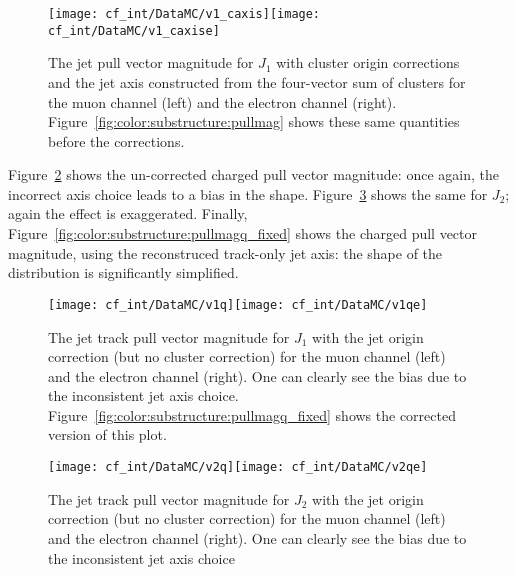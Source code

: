 \begin{figure}[h!]
\begin{center}
\texttt{[image: cf\_int/DataMC/v1\_caxis]}\texttt{[image: cf\_int/DataMC/v1\_caxise]}
 \caption{The jet pull vector magnitude for $J_1$ with cluster origin corrections and the jet axis constructed from the four-vector sum of clusters for the muon channel (left) and the electron channel (right). Figure~\ref{fig:color:substructure:pullmag} shows these same quantities before the corrections.}
 \label{fig:color:substructure:pullmag_fixed}
  \end{center}
\end{figure}


Figure~\ref{fig:color:substructure:pullmagq} shows the un-corrected charged pull vector magnitude: once again, the incorrect axis choice leads to a bias in the shape. Figure~\ref{fig:color:substructure:pullmagq_2} shows the same for $J_2$; again the effect is exaggerated. Finally, Figure~\ref{fig:color:substructure:pullmagq_fixed} shows the charged pull vector magnitude, using the reconstruced track-only jet axis: the shape of the distribution is significantly simplified.

\begin{figure}[h!]
\begin{center}
\texttt{[image: cf\_int/DataMC/v1q]}\texttt{[image: cf\_int/DataMC/v1qe]}
 \caption{The jet track pull vector magnitude for $J_1$ with the jet origin correction (but no cluster correction) for the muon channel (left) and the electron channel (right). One can clearly see the bias due to the inconsistent jet axis choice. Figure~\ref{fig:color:substructure:pullmagq_fixed} shows the corrected version of this plot.}
 \label{fig:color:substructure:pullmagq}
  \end{center}
\end{figure}

\begin{figure}[h!]
\begin{center}
\texttt{[image: cf\_int/DataMC/v2q]}\texttt{[image: cf\_int/DataMC/v2qe]}
 \caption{The jet track pull vector magnitude for $J_2$ with the jet origin correction (but no cluster correction) for the muon channel (left) and the electron channel (right). One can clearly see the bias due to the inconsistent jet axis choice}
 \label{fig:color:substructure:pullmagq_2}
  \end{center}
\end{figure}

